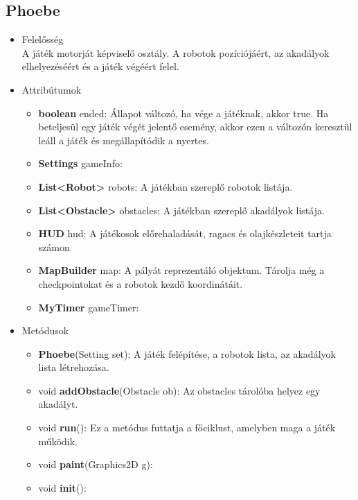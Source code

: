 \subsection{Phoebe}
\begin{itemize}
\item Felelősség\\
A játék motorját képviselő osztály. A robotok pozíciójáért, az akadályok elhelyezéséért és a játék végéért felel.
\item Attribútumok
	\begin{itemize}
		\item \textbf{boolean} ended: Állapot változó, ha vége a játéknak, akkor true. Ha beteljesül egy játék végét jelentő esemény, akkor ezen a változón keresztül leáll a játék és megállapítódik a nyertes.
		\item \textbf{Settings} gameInfo: 
		\item \textbf{List<Robot>} robots: A játékban szereplő robotok listája.
		\item \textbf{List<Obstacle>} obstacles: A játékban szereplő akadályok listája.
		\item \textbf{HUD} hud: A játékosok előrehaladását, ragacs és olajkészleteit tartja számon
		\item \textbf{MapBuilder} map: A pályát reprezentáló objektum. Tárolja még a checkpointokat és a robotok kezdő koordinátáit.
		\item \textbf{MyTimer} gameTimer: 
	\end{itemize}
\item Metódusok
	\begin{itemize}
		\item \textbf{Phoebe}(Setting set): A játék felépítése, a robotok lista, az akadályok lista létrehozása.
		\item void \textbf{addObstacle}(Obstacle ob): Az obstacles tárolóba helyez egy akadályt.
		\item void \textbf{run}(): Ez a metódus futtatja a főciklust, amelyben maga a játék működik.
		\item void \textbf{paint}(Graphics2D g): 
		\item void \textbf{init}(): 
	\end{itemize}
\end{itemize}


